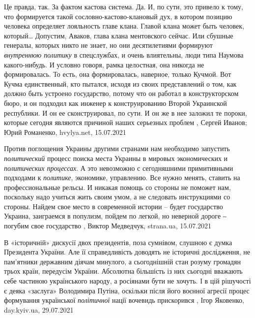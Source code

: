 Це правда, так. За фактом кастова система.
Да. И, по сути, это привело к тому, что формируется такой
сословно-кастово-клановый дух, в котором позицию человека определяет лояльность
главе клана. Главой клана может быть человек, который… Допустим, Аваков, глава
клана ментовского сейчас. Или сбушные генералы, которых никто не знает, но они
десятилетиями формируют \emph{внутреннюю политику} в спецслужбах, и очень влиятельны,
люди типа Наумова какого-нибудь. И условно говоря, рамка целостная, она никогда
не формировалась. То есть, она формировалась, наверное, только Кучмой.
Вот Кучма единственный, кто пытался, исходя из своих представлений о том, как
должно быть устроено государство, потому что он работал в конструкторском бюро,
и он подходил как инженер к конструированию Второй Украинской республики. И он
ее сконструировал, по сути. И он же в нее заложил те пороки, которые сегодня
являются причиной наших серьезных проблем
, 
Сергей Иванов; Юрий Романенко, hvylya.net, 15.07.2021

Против поглощения Украины другими странами нам необходимо запустить
\emph{политический} процесс поиска места Украины в мировых экономических и
\emph{политических процессах}. А это невозможно с сегодняшними примитивными подходами
к \emph{политике}, экономике, управлению. Все нужно менять, ставить на
профессиональные рельсы. И никакая помощь со стороны не поможет нам, поскольку
надо учиться жить своим умом, а не следовать инструкциями со стороны. Найдем
свое место в современной истории – будет государство Украина, заиграемся в
популизм, пойдем по легкой, но неверной дороге ‒ погубим свое государство
, 
Виктор Медведчук, strana.ua, 15.07.2021

В «історичній» дискусії двох президентів, поза сумнівом, слушною є думка
Президента України. Але її справедливість доводять не історичні дослідження, не
пам’ятники державним діячам минулого, а сьогоднішній стан розуму громадян трьох
країн, передусім України. Абсолютна більшість із них сьогодні вважають себе
частиною українського народу, а росіянами бути не хочуть. І в цій рішучості є
деяка «заслуга» Володимира Путіна, оскільки після його воєнної агресії процес
формування української \emph{політичної} нації вочевидь прискорився
, 
Ігор Яковенко, day.kyiv.ua, 29.07.2021
